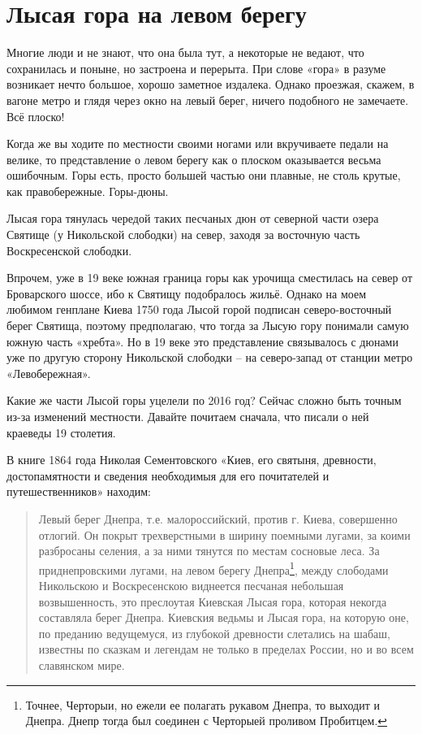 \chapter{Лысая гора на левом берегу}
   
Многие люди и не знают, что она была тут, а некоторые не ведают, что сохранилась и поныне, но застроена и перерыта. При слове «гора» в разуме возникает нечто большое, хорошо заметное издалека. Однако проезжая, скажем, в вагоне метро и глядя через окно на левый берег, ничего подобного не замечаете. Всё плоско!

Когда же вы ходите по местности своими ногами или вкручиваете педали на велике, то представление о левом берегу как о плоском оказывается весьма ошибочным. Горы есть, просто большей частью они плавные, не столь крутые, как правобережные. Горы-дюны.

Лысая гора тянулась чередой таких песчаных дюн от северной части озера Святище (у Никольской слободки) на север, заходя за восточную часть Воскресенской слободки.

Впрочем, уже в 19 веке южная граница горы как урочища сместилась на север от Броварского шоссе, ибо к Святищу подобралось жильё. Однако на моем любимом генплане Киева 1750 года Лысой горой подписан северо-восточный берег Святища, поэтому предполагаю, что тогда за Лысую гору понимали самую южную часть «хребта». Но в 19 веке это представление связывалось с дюнами уже по другую сторону Никольской слободки – на северо-запад от станции метро «Левобережная».

Какие же части Лысой горы уцелели по 2016 год? Сейчас сложно быть точным из-за изменений местности. Давайте почитаем сначала, что писали о ней краеведы 19 столетия.

В книге 1864 года Николая Сементовского «Киев, его святыня, древности, достопамятности и сведения необходимыя для его почитателей и путешественников» находим:

\begin{quotation}
Левый берег Днепра, т.е. малороссийский, против г. Киева, совершенно отлогий. Он покрыт трехверстными в ширину поемными лугами, за коими разбросаны селения, а за ними тянутся по местам сосновые леса. За приднепровскими лугами, на левом берегу Днепра\footnote{Точнее, Черторыи, но ежели ее полагать рукавом Днепра, то выходит и Днепра. Днепр тогда был соединен с Черторыей проливом Пробитцем.}, между слободами Никольскою и Воскресенскою виднеется песчаная небольшая возвышенность, это преслоутая Киевская Лысая гора, которая некогда составляла берег Днепра. Киевския ведьмы и Лысая гора, на которую оне, по преданию ведущемуся, из глубокой древности слетались на шабаш, известны по сказкам и легендам не только в пределах России, но и во всем славянском мире.
\end{quotation}

